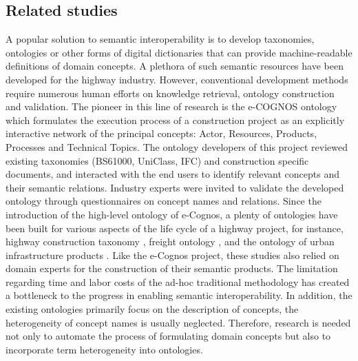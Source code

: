 \documentclass[Journal, BackFigs, DoubleSpace]{ascelike}%
\begin{document}
\subsection{Related studies}
A popular solution to semantic interoperability is to develop taxonomies, ontologies or other forms of digital dictionaries that can provide machine-readable definitions of domain concepts. A plethora of such semantic resources have been developed for the highway industry. However, conventional development methods require numerous human efforts on knowledge retrieval, ontology construction and validation. The pioneer in this line of research is the e-COGNOS ontology \cite{wetherill02,lima05} which formulates the execution process of a construction project as an explicitly interactive network of the principal concepts: Actor, Resources, Products, Processes and Technical Topics. The ontology developers of this project reviewed existing taxonomies (BS61000, UniClass, IFC) and construction specific documents, and interacted with the end users to identify relevant concepts and their semantic relations. Industry experts were invited to validate the developed ontology through questionnaires on concept names and relations. Since the introduction of the high-level ontology of e-Cognos, a plenty of ontologies have been built for various aspects of the life cycle of a highway project, for instance, highway construction taxonomy \cite{el-diraby05,el-diraby05b}, freight ontology \cite{seedah15}, and the ontology of urban infrastructure products \cite{osman06}. Like the e-Cognos project, these studies also relied on domain experts for the construction of their semantic products. The limitation regarding time and labor costs of the ad-hoc traditional methodology has created a bottleneck to the progress in enabling semantic interoperability. In addition, the existing ontologies primarily focus on the description of concepts, the heterogeneity of concept names is usually neglected. Therefore, research is needed not only to automate the process of formulating domain concepts but also to incorporate term heterogeneity into ontologies.
\par
\end{document}
